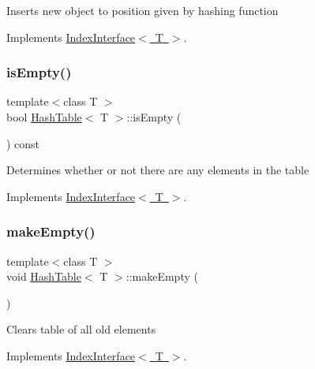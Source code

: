 Inserts new object to position given by hashing function 

Implements \mbox{\hyperlink{classIndexInterface}{Index\+Interface$<$ T $>$}}.

\mbox{\label{classHashTable_a3e2bab230f4dd25ba9510f49c5be2b36}} 
\subsubsection{\texorpdfstring{is\+Empty()}{isEmpty()}}
{\footnotesize\ttfamily template$<$class T $>$ \\
bool \mbox{\hyperlink{classHashTable}{Hash\+Table}}$<$ T $>$\+::is\+Empty (\begin{DoxyParamCaption}{ }\end{DoxyParamCaption}) const\hspace{0.3cm}{\ttfamily [virtual]}}

Determines whether or not there are any elements in the table 

Implements \mbox{\hyperlink{classIndexInterface}{Index\+Interface$<$ T $>$}}.

\mbox{\label{classHashTable_aaed86109363c5412e7aeebeb0200fe44}} 
\subsubsection{\texorpdfstring{make\+Empty()}{makeEmpty()}}
{\footnotesize\ttfamily template$<$class T $>$ \\
void \mbox{\hyperlink{classHashTable}{Hash\+Table}}$<$ T $>$\+::make\+Empty (\begin{DoxyParamCaption}{ }\end{DoxyParamCaption})\hspace{0.3cm}{\ttfamily [virtual]}}

Clears table of all old elements 

Implements \mbox{\hyperlink{classIndexInterface}{Index\+Interface$<$ T $>$}}.

\mbox{\label{classHashTable_a7db250d46e886751910efdb0e0ac7aad}} 
